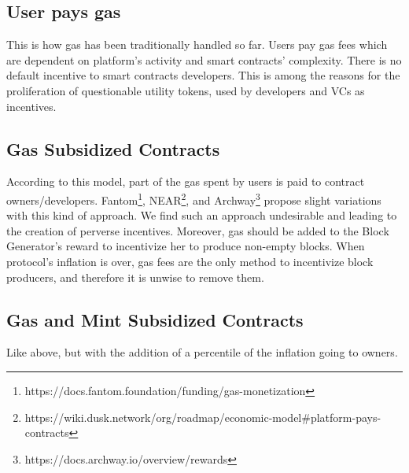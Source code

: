 \documentclass[twocolumn, nofootinbib]{revtex4-2}
\begin{document}
    \subsection{User pays gas}\label{subsec:user-pays-gas}
    This is how gas has been traditionally handled so far.
    Users pay gas fees which are dependent on platform's activity and smart
    contracts' complexity.
    There is no default incentive to smart contracts developers.
    This is among the reasons for the proliferation of questionable utility
    tokens, used by developers and VCs as incentives.

    \subsection{Gas Subsidized Contracts}\label{subsec:gas-subsidized-contracts}
    According to this model, part of the gas spent by users is paid to contract
    owners/developers.
    Fantom\footnote{https://docs.fantom.foundation/funding/gas-monetization},
    NEAR\footnote{https://wiki.dusk.network/org/roadmap/economic-model\#platform-pays-contracts},
    and Archway\footnote{https://docs.archway.io/overview/rewards} propose slight
    variations with this kind of approach.
    We find such an approach undesirable and leading to the creation of perverse
    incentives.
    Moreover, gas should be added to the Block Generator's reward to
    incentivize her to produce non-empty blocks.
    When protocol's inflation is over, gas fees are the only method to
    incentivize block producers, and therefore it is unwise to remove them.

    \subsection{Gas and Mint Subsidized Contracts}\label{subsec:gas-and-mint-subsidized-contracts}
    Like above, but with the addition of a percentile of the inflation going to
    owners.
\end{document}
